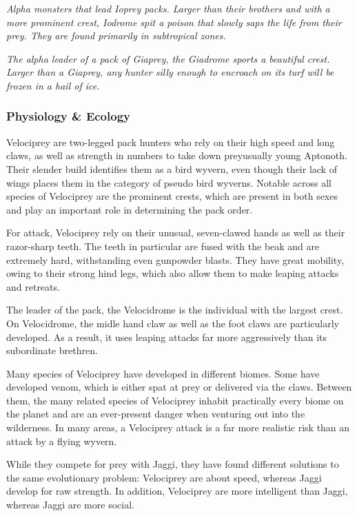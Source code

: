 \textit{Alpha monsters that lead Ioprey packs. Larger than their brothers and with a more prominent crest, Iodrome spit a poison that slowly saps the life from their prey. They are found primarily in subtropical zones.}\par{}

\textit{The alpha leader of a pack of Giaprey, the Giadrome sports a beautiful crest. Larger than a Giaprey, any hunter silly enough to encroach on its turf will be frozen in a hail of ice.}

\subsubsection{Physiology \& Ecology}
Velociprey are two-legged pack hunters who rely on their high speed and long claws, as well as strength in numbers to take down prey\hbNone usually young Aptonoth. Their slender build identifies them as a bird wyvern, even though their lack of wings places them in the category of pseudo bird wyverns. Notable across all species of Velociprey are the prominent crests, which are present in both sexes and play an important role in determining the pack order.

For attack, Velociprey rely on their unusual, seven-clawed hands as well as their razor-sharp teeth. The teeth in particular are fused with the beak and are extremely hard, withstanding even gunpowder blasts. They have great mobility, owing to their strong hind legs, which also allow them to make leaping attacks and retreats.

The leader of the pack, the Velocidrome is the individual with the largest crest. On Velocidrome, the midle hand claw as well as the foot claws are particularly developed. As a result, it uses leaping attacks far more aggressively than its subordinate brethren.

Many species of Velociprey have developed in different biomes. Some have developed venom, which is either spat at prey or delivered via the claws. Between them, the many related species of Velociprey inhabit practically every biome on the planet and are an ever-present danger when venturing out into the wilderness. In many areas, a Velociprey attack is a far more realistic risk than an attack by a flying wyvern.

While they compete for prey with Jaggi, they have found different solutions to the same evolutionary problem: Velociprey are about speed, whereas Jaggi develop for raw strength. In addition, Velociprey are more intelligent than Jaggi, whereas Jaggi are more social.

